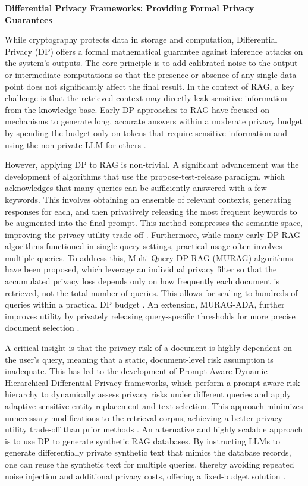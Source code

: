\documentclass[11pt]{article}
\begin{document}
\textbf{Differential Privacy Frameworks: Providing Formal Privacy Guarantees}

While cryptography protects data in storage and computation, Differential Privacy (DP) offers a formal mathematical guarantee against inference attacks on the system's outputs. The core principle is to add calibrated noise to the output or intermediate computations so that the presence or absence of any single data point does not significantly affect the final result. In the context of RAG, a key challenge is that the retrieved context may directly leak sensitive information from the knowledge base. Early DP approaches to RAG have focused on mechanisms to generate long, accurate answers within a moderate privacy budget by spending the budget only on tokens that require sensitive information and using the non-private LLM for others \cite{ref490}.

However, applying DP to RAG is non-trivial. A significant advancement was the development of algorithms that use the propose-test-release paradigm, which acknowledges that many queries can be sufficiently answered with a few keywords. This involves obtaining an ensemble of relevant contexts, generating responses for each, and then privatively releasing the most frequent keywords to be augmented into the final prompt. This method compresses the semantic space, improving the privacy-utility trade-off \cite{ref491}. Furthermore, while many early DP-RAG algorithms functioned in single-query settings, practical usage often involves multiple queries. To address this, Multi-Query DP-RAG (MURAG) algorithms have been proposed, which leverage an individual privacy filter so that the accumulated privacy loss depends only on how frequently each document is retrieved, not the total number of queries. This allows for scaling to hundreds of queries within a practical DP budget \cite{ref492}. An extension, MURAG-ADA, further improves utility by privately releasing query-specific thresholds for more precise document selection \cite{ref492}.

A critical insight is that the privacy risk of a document is highly dependent on the user's query, meaning that a static, document-level risk assumption is inadequate. This has led to the development of Prompt-Aware Dynamic Hierarchical Differential Privacy frameworks, which perform a prompt-aware risk hierarchy to dynamically assess privacy risks under different queries and apply adaptive sensitive entity replacement and text selection. This approach minimizes unnecessary modifications to the retrieval corpus, achieving a better privacy-utility trade-off than prior methods \cite{ref493}. An alternative and highly scalable approach is to use DP to generate synthetic RAG databases. By instructing LLMs to generate differentially private synthetic text that mimics the database records, one can reuse the synthetic text for multiple queries, thereby avoiding repeated noise injection and additional privacy costs, offering a fixed-budget solution \cite{ref494}.
\end{document}
